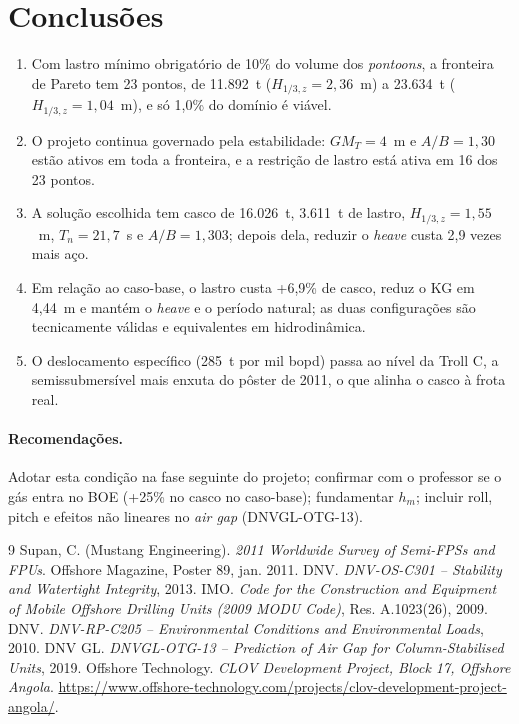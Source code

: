 \documentclass[11pt,a4paper]{article}
\newcommand{\Hz}{H_{1/3,z}}
\begin{document}
\section{Conclusões}

\begin{enumerate}
\item Com lastro mínimo obrigatório de 10\% do volume dos \emph{pontoons}, a fronteira de Pareto
tem 23 pontos, de 11.892~t ($\Hz = 2{,}36$~m) a 23.634~t ($\Hz = 1{,}04$~m), e só 1,0\% do
domínio é viável.
\item O projeto continua governado pela estabilidade: $GM_T = 4$~m e $A/B = 1{,}30$ estão ativos
em toda a fronteira, e a restrição de lastro está ativa em 16 dos 23 pontos.
\item A solução escolhida tem casco de 16.026~t, 3.611~t de lastro, $\Hz = 1{,}55$~m,
$T_n = 21{,}7$~s e $A/B = 1{,}303$; depois dela, reduzir o \emph{heave} custa 2,9 vezes mais aço.
\item Em relação ao caso-base, o lastro custa +6,9\% de casco, reduz o KG em 4,44~m e mantém o
\emph{heave} e o período natural; as duas configurações são tecnicamente válidas e equivalentes
em hidrodinâmica.
\item O deslocamento específico (285~t por mil bopd) passa ao nível da Troll C, a
semissubmersível mais enxuta do pôster de 2011, o que alinha o casco à frota real.
\end{enumerate}

\paragraph{Recomendações.} Adotar esta condição na fase seguinte do projeto; confirmar com o
professor se o gás entra no BOE (+25\% no casco no caso-base); fundamentar $h_m$; incluir roll,
pitch e efeitos não lineares no \emph{air gap} (DNVGL-OTG-13).

\begin{thebibliography}{9}
 Supan, C. (Mustang Engineering). \emph{2011 Worldwide Survey of Semi-FPSs and
FPUs}. Offshore Magazine, Poster 89, jan. 2011.
 DNV. \emph{DNV-OS-C301 -- Stability and Watertight Integrity}, 2013.
 IMO. \emph{Code for the Construction and Equipment of Mobile Offshore Drilling
Units (2009 MODU Code)}, Res. A.1023(26), 2009.
 DNV. \emph{DNV-RP-C205 -- Environmental Conditions and Environmental Loads}, 2010.
 DNV GL. \emph{DNVGL-OTG-13 -- Prediction of Air Gap for Column-Stabilised
Units}, 2019.
 Offshore Technology. \emph{CLOV Development Project, Block 17, Offshore Angola}.
\url{https://www.offshore-technology.com/projects/clov-development-project-angola/}.
\end{thebibliography}
\end{document}
